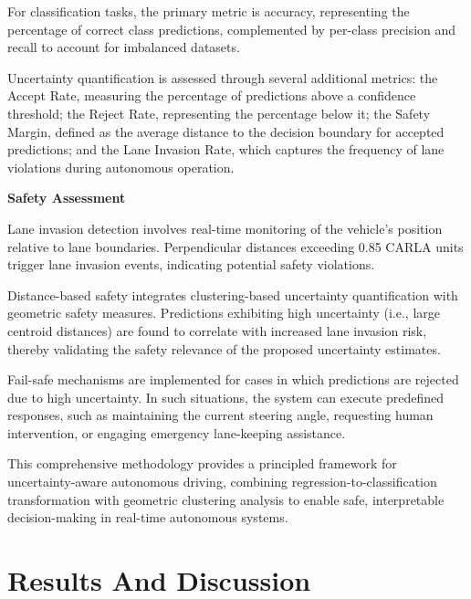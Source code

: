 For classification tasks, the primary metric is accuracy, representing the percentage of correct class predictions, complemented by per-class precision and recall to account for imbalanced datasets.

Uncertainty quantification is assessed through several additional metrics: the Accept Rate, measuring the percentage of predictions above a confidence threshold; the Reject Rate, representing the percentage below it; the Safety Margin, defined as the average distance to the decision boundary for accepted predictions; and the Lane Invasion Rate, which captures the frequency of lane violations during autonomous operation.


\textbf{Safety Assessment}

Lane invasion detection involves real-time monitoring of the vehicle's position relative to lane boundaries. Perpendicular distances exceeding 0.85 CARLA units trigger lane invasion events, indicating potential safety violations.

Distance-based safety integrates clustering-based uncertainty quantification with geometric safety measures. Predictions exhibiting high uncertainty (i.e., large centroid distances) are found to correlate with increased lane invasion risk, thereby validating the safety relevance of the proposed uncertainty estimates.

Fail-safe mechanisms are implemented for cases in which predictions are rejected due to high uncertainty. In such situations, the system can execute predefined responses, such as maintaining the current steering angle, requesting human intervention, or engaging emergency lane-keeping assistance.

This comprehensive methodology provides a principled framework for uncertainty-aware autonomous driving, combining regression-to-classification transformation with geometric clustering analysis to enable safe, interpretable decision-making in real-time autonomous systems.


\section{Results And Discussion}



